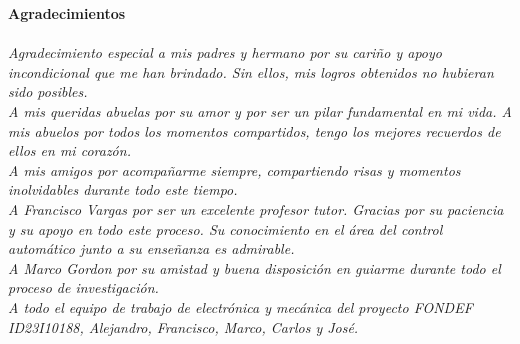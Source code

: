\clearpage
\setlength{\parindent}{0cm}
    \vspace{15mm}
	{\huge {\bf Agradecimientos}}\\
\vspace{2cm}
	\large
	\\
\textit{Agradecimiento especial a mis padres y hermano por su cariño y apoyo incondicional que me han brindado. Sin ellos, mis logros obtenidos no hubieran sido posibles.}\\

\textit{A mis queridas abuelas por su amor y por ser un pilar fundamental en mi vida. A mis abuelos por todos los momentos compartidos, tengo los mejores recuerdos de ellos en mi corazón.} \\

\textit{A mis amigos por acompañarme siempre, compartiendo risas y momentos inolvidables durante todo este tiempo.} \\

\textit{A Francisco Vargas por ser un excelente profesor tutor. Gracias por su paciencia y su apoyo en todo este proceso. Su conocimiento en el área del control automático junto a su enseñanza es admirable.} \\

\textit{A Marco Gordon por su amistad y buena disposición en guiarme durante todo el proceso de investigación.} \\

\textit{A todo el equipo de trabajo de electrónica y mecánica del proyecto FONDEF ID23I10188, Alejandro, Francisco, Marco, Carlos y José.} \\




